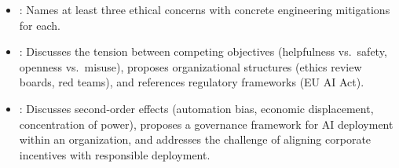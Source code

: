 \begin{interviewq}

\goodgreat
\begin{itemize}
    \item {}: Names at least three ethical concerns with concrete
    engineering mitigations for each.
    \item {}: Discusses the tension between competing objectives
    (helpfulness vs.\ safety, openness vs.\ misuse), proposes organizational
    structures (ethics review boards, red teams), and references regulatory
    frameworks (EU AI Act).
    \item {}: Discusses second-order effects (automation bias,
    economic displacement, concentration of power), proposes a governance
    framework for AI deployment within an organization, and addresses the
    challenge of aligning corporate incentives with responsible deployment.
\end{itemize}

\end{interviewq}

\vspace{0.5em}

